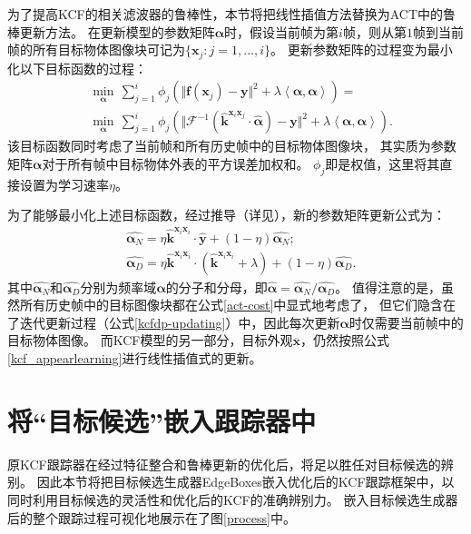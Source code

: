 为了提高KCF的相关滤波器的鲁棒性，本节将把线性插值方法替换为ACT中的鲁棒更新方法。
在更新模型的参数矩阵$\boldsymbol{\alpha}$时，假设当前帧为第$i$帧，则从第$1$帧到当前帧的所有目标物体图像块可记为$\{\mathbf{x}_j : j=1, ..., i\}$。
更新参数矩阵的过程变为最小化以下目标函数的过程：
\begin{equation}
\begin{aligned}
	&\underset{\boldsymbol{\alpha}}{\min}\,\sum_{j=1}^{i}\phi_j(\Vert\mathbf{f}(\mathbf{x}_j)-\mathbf{y}\Vert^{2}+\lambda \left\langle\boldsymbol{\alpha}, \boldsymbol{\alpha}\right\rangle)=
	\\
	&\underset{\boldsymbol{\alpha}}{\min}\,\sum_{j=1}^{i}\phi_j(\Vert\mathcal{F}^{-1}(\hat{\mathbf{k}}^{\mathbf{x}_i\mathbf{x}_j}\cdot\hat{\boldsymbol{\alpha}})-\mathbf{y}\Vert^{2}+\lambda \left\langle\boldsymbol{\alpha}, \boldsymbol{\alpha}\right\rangle).
	\label{act-cost}
\end{aligned}
\end{equation}
该目标函数同时考虑了当前帧和所有历史帧中的目标物体图像块，
其实质为参数矩阵$\boldsymbol{\alpha}$对于所有帧中目标物体外表的平方误差加权和。
$\phi_j$即是权值，这里将其直接设置为学习速率$\eta$。

为了能够最小化上述目标函数，经过推导（详见\cite{act}），新的参数矩阵更新公式为：
\begin{equation}
\begin{aligned}
	&\hat{\boldsymbol{\alpha}_N}=\eta\hat{\mathbf{k}}^{\mathbf{x}_i \mathbf{x}_i} \cdot \hat{\mathbf{y}} + (1-\eta){\hat{\boldsymbol{\alpha}_N}};
	\\
	&\hat{\boldsymbol{\alpha}_D}=\eta\hat{\mathbf{k}}^{\mathbf{x}_i \mathbf{x}_i} \cdot (\hat{\mathbf{k}}^{\mathbf{x}_i \mathbf{x}_i} +
	\lambda) + (1-\eta){\hat{\boldsymbol{\alpha}_D}}.\label{kcfdp-updating}
\end{aligned}
\end{equation}
其中$\hat{\boldsymbol{\alpha}_N}$和$\hat{\boldsymbol{\alpha}_D}$分别为频率域$\boldsymbol{\alpha}$的分子和分母，即$\hat{\boldsymbol{\alpha}}={\hat{{\boldsymbol{\alpha}_N}}}/{\hat{{\boldsymbol{\alpha}_D}}}$。
值得注意的是，虽然所有历史帧中的目标图像块都在公式\ref{act-cost}中显式地考虑了，
但它们隐含在了迭代更新过程（公式\ref{kcfdp-updating}）中，因此每次更新$\boldsymbol{\alpha}$时仅需要当前帧中的目标物体图像。
而KCF模型的另一部分，目标外观$\overline{\mathbf{x}}$，仍然按照公式\ref{kcf_appearlearning}进行线性插值式的更新。

\section{将``目标候选''嵌入跟踪器中}
\label{wholeprocesssec}
原KCF跟踪器在经过特征整合和鲁棒更新的优化后，将足以胜任对目标候选的辨别。
因此本节将把目标候选生成器EdgeBoxes嵌入优化后的KCF跟踪框架中，以同时利用目标候选的灵活性和优化后的KCF的准确辨别力。
嵌入目标候选生成器后的整个跟踪过程可视化地展示在了图\ref{process}中。

